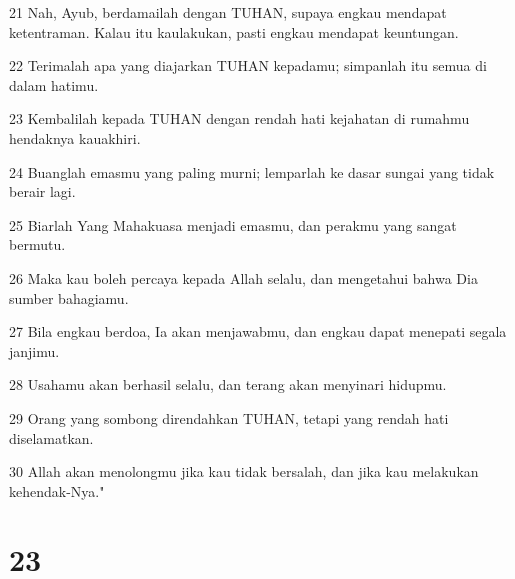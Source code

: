 \par 21 Nah, Ayub, berdamailah dengan TUHAN, supaya engkau mendapat ketentraman. Kalau itu kaulakukan, pasti engkau mendapat keuntungan.
\par 22 Terimalah apa yang diajarkan TUHAN kepadamu; simpanlah itu semua di dalam hatimu.
\par 23 Kembalilah kepada TUHAN dengan rendah hati kejahatan di rumahmu hendaknya kauakhiri.
\par 24 Buanglah emasmu yang paling murni; lemparlah ke dasar sungai yang tidak berair lagi.
\par 25 Biarlah Yang Mahakuasa menjadi emasmu, dan perakmu yang sangat bermutu.
\par 26 Maka kau boleh percaya kepada Allah selalu, dan mengetahui bahwa Dia sumber bahagiamu.
\par 27 Bila engkau berdoa, Ia akan menjawabmu, dan engkau dapat menepati segala janjimu.
\par 28 Usahamu akan berhasil selalu, dan terang akan menyinari hidupmu.
\par 29 Orang yang sombong direndahkan TUHAN, tetapi yang rendah hati diselamatkan.
\par 30 Allah akan menolongmu jika kau tidak bersalah, dan jika kau melakukan kehendak-Nya."

\chapter{23}

